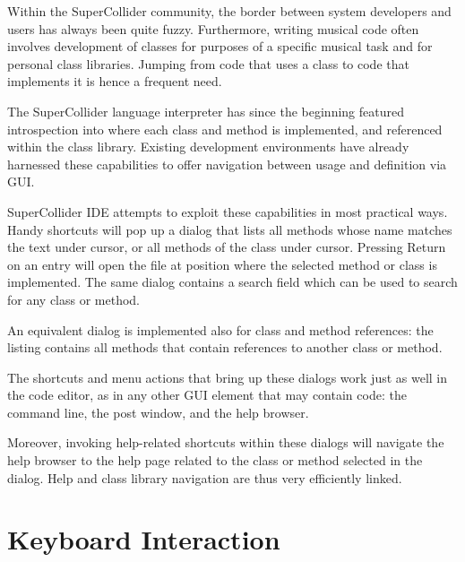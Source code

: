 \documentclass[11pt,a4paper]{article}
\begin{document}
Within the SuperCollider community, the border between system developers and users has always been
quite fuzzy. Furthermore, writing musical code often involves development of classes for purposes of
a specific musical task and for personal class libraries. Jumping from code that uses a class to
code that implements it is hence a frequent need.

The SuperCollider language interpreter has since the beginning featured introspection into where
each class and method is implemented, and referenced within the class library. Existing development
environments have already harnessed these capabilities to offer navigation between usage and
definition via GUI.

SuperCollider IDE attempts to exploit these capabilities in most practical ways. Handy shortcuts
will pop up a dialog that lists all methods whose name matches the text under cursor, or all methods
of the class under cursor. Pressing Return on an entry will open the file at position where the
selected method or class is implemented. The same dialog contains a search field which can be used
to search for any class or method.

An equivalent dialog is implemented also for class and method references: the listing contains
all methods that contain references to another class or method.

The shortcuts and menu actions that bring up these dialogs work just as well in the code editor,
as in any other GUI element that may contain code: the command line, the post window, and the help
browser.

Moreover, invoking help-related shortcuts within these dialogs will navigate the help browser to the
help page related to the class or method selected in the dialog. Help and class library navigation
are thus very efficiently linked.

\section{Keyboard Interaction}
\end{document}
